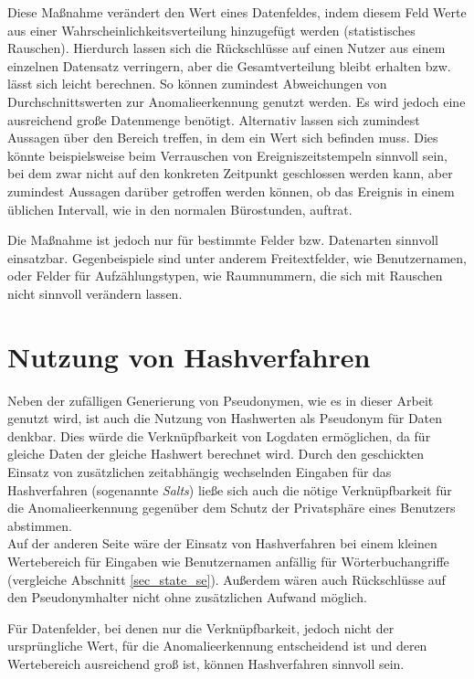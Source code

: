 Diese Maßnahme verändert den Wert eines Datenfeldes, indem diesem Feld Werte aus einer Wahrscheinlichkeitsverteilung hinzugefügt werden (statistisches Rauschen). 
Hierdurch lassen sich die Rückschlüsse auf einen Nutzer aus einem einzelnen Datensatz verringern, aber die Gesamtverteilung bleibt erhalten bzw. lässt sich leicht berechnen. 
So können zumindest Abweichungen von Durchschnittswerten zur Anomalieerkennung genutzt werden. 
Es wird jedoch eine ausreichend große Datenmenge benötigt. Alternativ lassen sich zumindest Aussagen über den Bereich treffen, in dem ein Wert sich befinden muss. Dies könnte beispielsweise beim Verrauschen von Ereigniszeitstempeln sinnvoll sein, bei dem zwar nicht auf den konkreten Zeitpunkt geschlossen werden kann, aber zumindest Aussagen darüber getroffen werden können, ob das Ereignis in einem üblichen Intervall, wie in den normalen Bürostunden, auftrat.

Die Maßnahme ist jedoch nur für bestimmte Felder bzw. Datenarten sinnvoll einsatzbar. Gegenbeispiele sind unter anderem Freitextfelder, wie Benutzernamen, oder Felder für Aufzählungstypen, wie Raumnummern, die sich mit Rauschen nicht sinnvoll verändern lassen. 

\section{Nutzung von Hashverfahren}

Neben der zufälligen Generierung von Pseudonymen, wie es in dieser Arbeit genutzt wird, ist auch die Nutzung von Hashwerten als Pseudonym für Daten denkbar. Dies würde die Verknüpfbarkeit von Logdaten ermöglichen, da für gleiche Daten der gleiche Hashwert berechnet wird. Durch den geschickten Einsatz von zusätzlichen zeitabhängig wechselnden Eingaben für das Hashverfahren (sogenannte \textit{Salts}) ließe sich auch die nötige Verknüpfbarkeit für die Anomalieerkennung gegenüber dem Schutz der Privatsphäre eines Benutzers abstimmen.\\
Auf der anderen Seite wäre der Einsatz von Hashverfahren bei einem kleinen Wertebereich für Eingaben wie Benutzernamen anfällig für Wörterbuchangriffe (vergleiche Abschnitt \ref{sec_state_se}). Außerdem wären auch Rückschlüsse auf den Pseudonymhalter nicht ohne zusätzlichen Aufwand möglich.

Für Datenfelder, bei denen nur die Verknüpfbarkeit, jedoch nicht der ursprüngliche Wert, für die Anomalieerkennung entscheidend ist und deren Wertebereich ausreichend groß ist, können Hashverfahren sinnvoll sein. 

